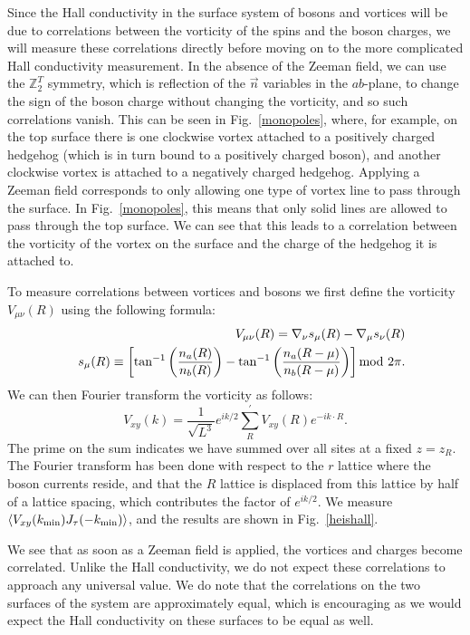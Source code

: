 \documentclass[prb,twocolumn]{revtex4-1}
\def\ra{\rangle} %
\def\la{\langle} %
\def\ztwot{\mathbb{Z}_2^T}
\begin{document}
Since the Hall conductivity in the surface system of bosons and vortices will be due to correlations between the vorticity of the spins and the boson charges,\cite{FQHE} we will measure these correlations directly before moving on to the more complicated Hall conductivity measurement. In the absence of the Zeeman field, we can use the $\ztwot$ symmetry, which is reflection of the $\vec n$ variables in the $ab$-plane, to change the sign of the boson charge without changing the vorticity, and so such correlations vanish. This can be seen in Fig.~\ref{monopoles}, where, for example, on the top surface there is one clockwise vortex attached to a positively charged hedgehog (which is in turn bound to a positively charged boson), and another clockwise vortex is attached to a negatively charged hedgehog. Applying a Zeeman field corresponds to only allowing one type of vortex line to pass through the surface. In Fig.~\ref{monopoles}, this means that only solid lines are allowed to pass through the top surface. We can see that this leads to a correlation between the vorticity of the vortex on the surface and the charge of the hedgehog it is attached to. 

To measure correlations between vortices and bosons we first define the vorticity $V_{\mu\nu}(R)$ using the following formula:
\begin{eqnarray}
&&V_{\mu\nu}(R)=\nabla_\nu s_{\mu}(R)-\nabla_\mu s_{\nu}(R)\\ 
&&s_{\mu}(R)\equiv \left[\tan^{-1}\left(\frac{n_a(R)}{n_b(R)}\right) -\tan^{-1}\left(\frac{n_a(R-\mu)}{n_b(R-\mu)}\right)\right]{\rm mod}~2\pi.\nonumber
\end{eqnarray}
We can then Fourier transform the vorticity as follows:
\begin{equation}
V_{xy}(k)=\frac{1}{\sqrt{L^3}}e^{ik/2}\sum_{R}  ^\prime V_{xy}(R) e^{-ik\cdot R}.
\end{equation}
The prime on the sum indicates we have summed over all sites at a fixed $z=z_R$. The Fourier transform has been done with respect to the $r$ lattice where the boson currents reside, and that the $R$ lattice is displaced from this lattice by half of a lattice spacing, which contributes the factor of $e^{ik/2}$. We measure $\la V_{xy}(k_{\rm min})J_\tau(-k_{\rm min})\ra$, and the results are shown in Fig.~\ref{heishall}. 

We see that as soon as a Zeeman field is applied, the vortices and charges become correlated. Unlike the Hall conductivity, we do not expect these correlations to approach any universal value. We do note that the correlations on the two surfaces of the system are approximately equal, which is encouraging as we would expect the Hall conductivity on these surfaces to be equal as well.
\end{document}
